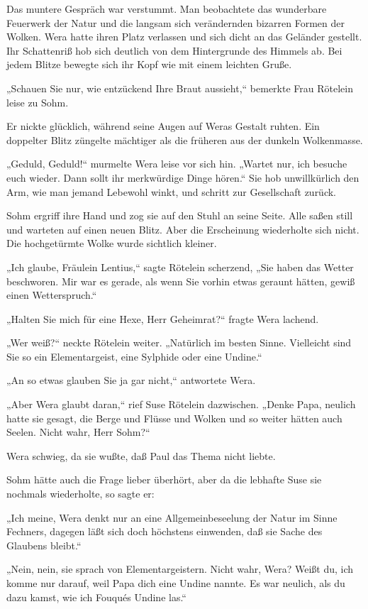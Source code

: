 Das muntere Gespräch war verstummt. Man beobachtete das wunderbare
Feuerwerk der Natur und die langsam sich verändernden bizarren
Formen der Wolken. Wera hatte ihren Platz verlassen und sich dicht
an das Geländer gestellt. Ihr Schattenriß hob sich deutlich von dem
Hintergrunde des Himmels ab. Bei jedem Blitze bewegte sich ihr Kopf
wie mit einem leichten Gruße.

„Schauen Sie nur, wie entzückend Ihre Braut aussieht,“ bemerkte
Frau Rötelein leise zu Sohm.

Er nickte glücklich, während seine Augen auf Weras Gestalt ruhten.
Ein doppelter Blitz züngelte mächtiger als die früheren aus der
dunkeln Wolkenmasse.

„Geduld, Geduld!“ murmelte Wera leise vor sich hin. „Wartet nur,
ich besuche euch wieder. Dann sollt ihr merkwürdige Dinge hören.“
Sie hob unwillkürlich den Arm, wie man jemand Lebewohl winkt, und
schritt zur Gesellschaft zurück.

Sohm ergriff ihre Hand und zog sie auf den Stuhl an seine Seite.
Alle saßen still und warteten auf einen neuen Blitz. Aber die
Erscheinung wiederholte sich nicht. Die hochgetürmte Wolke wurde
sichtlich kleiner.

„Ich glaube, Fräulein Lentius,“ sagte Rötelein scherzend, „Sie
haben das Wetter beschworen. Mir war es gerade, als wenn Sie vorhin
etwas geraunt hätten, gewiß einen Wetterspruch.“

„Halten Sie mich für eine Hexe, Herr Geheimrat?“ fragte Wera
lachend.

„Wer weiß?“ neckte Rötelein weiter. „Natürlich im besten Sinne.
Vielleicht sind Sie so ein Elementargeist, eine Sylphide oder eine
Undine.“

„An so etwas glauben Sie ja gar nicht,“ antwortete Wera.

„Aber Wera glaubt daran,“ rief Suse Rötelein dazwischen. „Denke
Papa, neulich hatte sie gesagt, die Berge und Flüsse und Wolken und
so weiter hätten auch Seelen. Nicht wahr, Herr Sohm?“

Wera schwieg, da sie wußte, daß Paul das Thema nicht liebte.

Sohm hätte auch die Frage lieber überhört, aber da die lebhafte
Suse sie nochmals wiederholte, so sagte er:

„Ich meine, Wera denkt nur an eine Allgemeinbeseelung der Natur im
Sinne Fechners, dagegen läßt sich doch höchstens einwenden, daß sie
Sache des Glaubens bleibt.“

„Nein, nein, sie sprach von Elementargeistern. Nicht wahr, Wera?
Weißt du, ich komme nur darauf, weil Papa dich eine Undine nannte.
Es war neulich, als du dazu kamst, wie ich Fouqués Undine las.“

